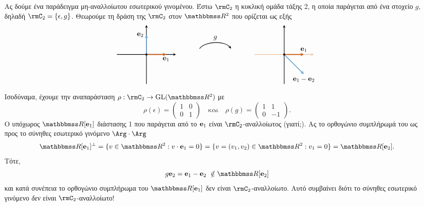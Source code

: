 \documentclass[12pt,a4paper,reqno]{amsart}
\begin{document}
Ας δούμε ένα παράδειγμα μη-αναλλοίωτου εσωτερικού γινομένου. Έστω $\rmC_2$ η κυκλική ομάδα τάξης 2, η οποία παράγεται από ένα στοχείο $g$, δηλαδή $\rmC_2 = \{\epsilon, g\}$. Θεωρούμε τη δράση της $\rmC_2$ στον $\RR^2$ που ορίζεται ως εξής
\[
\begin{tikzpicture}[>=stealth, thick, scale=1]
    \begin{scope}[shift={(-1,0)}]
        \draw[->] (-1.5,0) -- (1.5,0);
        \draw[->] (0,-1.5) -- (0,1.5);

        \draw[->, burntorange, very thick] (0,0) -- (1,0) node[below] {\textcolor{black}{$\bfe_1$}};
        \draw[->, iceberg, very thick] (0,0) -- (0,1) node[left] {\textcolor{black}{$\bfe_2$}};

        \fill (0,0) circle (1.5pt);
    \end{scope}
    \begin{scope}[shift={(6,0)}]
        \draw[->,burntorange!40] (-1.5,0) -- (1.5,0);
        \draw[->] (0,-1.5) -- (0,1.5);

        \draw[->, burntorange, very thick] (0,0) -- (1,0) node[above] {\textcolor{black}{$\bfe_1$}};
        \draw[->, iceberg, very thick] (0,0) -- (1,-1) node[below] {\textcolor{black}{$\bfe_1 - \bfe_2$}};

        \fill (0,0) circle (1.5pt);
    \end{scope}

    \draw[->, thick]
    (1.7,0.3) .. controls (2,0.7) and (3,0.7) .. (3.3,0.3)
    node[midway, above] {$g$};
\end{tikzpicture}
\]
Ισοδύναμα, έχουμε την αναπαράσταση $\rho : \rmC_2 \to \GL(\RR^2)$ με 
\[
\rho(\epsilon) = 
\begin{pmatrix}
    1 & 0 \\
    0 & 1
\end{pmatrix}
\quad
\text{και}
\quad
\rho(g) = 
\begin{pmatrix}
    1 & 1 \\
    0 & -1
\end{pmatrix}.
\]
Ο υπόχωρος $\RR[\bfe_1]$ διάστασης 1 που παράγεται από το $\mathbf{e}_1$ είναι $\rmC_2$-αναλλοίωτος (γιατί;). Ας  το ορθογώνιο συμπλήρωμά του ως προς το σύνηθες εσωτερικό γινόμενο $\Arg\cdot\Arg$
\[
\RR[\bfe_1]^\perp  = \{v \in \RR^2 : v\cdot\bfe_1 = 0\} = \{v = (v_1, v_2) \in \RR^2 : v_1= 0\} = \RR[\bfe_2].
\]
Τότε, 
\[
g\bfe_2 = \bfe_1 - \bfe_2 \ \notin \RR[\bfe_2]
\]
και κατά συνέπεια το ορθογώνιο συμπλήρωμα του $\RR[\bfe_1]$ δεν είναι $\rmC_2$-αναλλοίωτο. Αυτό συμβαίνει διότι το σύνηθες εσωτερικό γινόμενο \emph{δεν} είναι $\rmC_2$-αναλλοίωτο!
\end{document}
